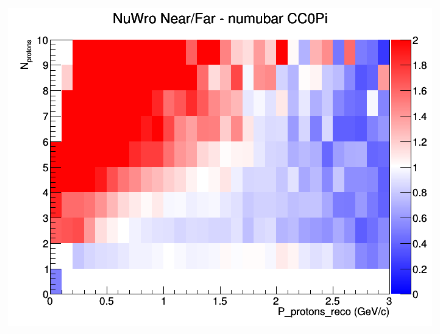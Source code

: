 \begin{figure}[h]
\endminipage
{}
\includegraphics[width=\linewidth]{eff_N_P/GAr/protons/ratios/CC0Pi_NuWro_numubar_NF_N_P.png}
\endminipage
\end{figure}
\clearpage
